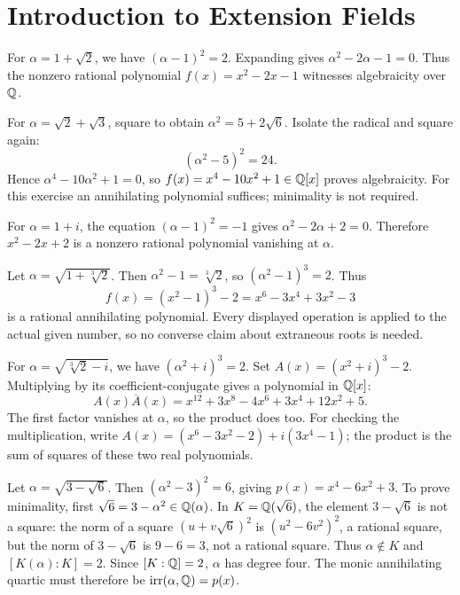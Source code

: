 \section{Introduction to Extension Fields}

For $\alpha=1+\sqrt2$, we have $(\alpha-1)^2=2$. Expanding gives $\alpha^2-2\alpha-1=0$. Thus the nonzero rational polynomial $f(x)=x^2-2x-1$ witnesses algebraicity over $\mathbb{Q}$.

For $\alpha=\sqrt2+\sqrt3$, square to obtain $\alpha^2=5+2\sqrt6$. Isolate the radical and square again:
\[(\alpha^2-5)^2=24.\]
Hence $\alpha^4-10\alpha^2+1=0$, so $f(x)=x^4-10x^2+1\in\mathbb{Q}[x]$ proves algebraicity. For this exercise an annihilating polynomial suffices; minimality is not required.

For $\alpha=1+i$, the equation $(\alpha-1)^2=-1$ gives $\alpha^2-2\alpha+2=0$. Therefore $x^2-2x+2$ is a nonzero rational polynomial vanishing at $\alpha$.

Let $\alpha=\sqrt{1+\sqrt[3]2}$. Then $\alpha^2-1=\sqrt[3]2$, so $(\alpha^2-1)^3=2$. Thus
\[f(x)=(x^2-1)^3-2=x^6-3x^4+3x^2-3\]
is a rational annihilating polynomial. Every displayed operation is applied to the actual given number, so no converse claim about extraneous roots is needed.

For $\alpha=\sqrt{\sqrt[3]2-i}$, we have $(\alpha^2+i)^3=2$. Set $A(x)=(x^2+i)^3-2$. Multiplying by its coefficient-conjugate gives a polynomial in $\mathbb{Q}[x]$:
\[
A(x)\overline{A}(x)=x^{12}+3x^8-4x^6+3x^4+12x^2+5.
\]
The first factor vanishes at $\alpha$, so the product does too. For checking the multiplication, write $A(x)=(x^6-3x^2-2)+i(3x^4-1)$; the product is the sum of squares of these two real polynomials.

Let $\alpha=\sqrt{3-\sqrt6}$. Then $(\alpha^2-3)^2=6$, giving $p(x)=x^4-6x^2+3$.
To prove minimality, first $\sqrt6=3-\alpha^2\in\mathbb{Q}(\alpha)$. In $K=\mathbb{Q}(\sqrt6)$, the element $3-\sqrt6$ is not a square: the norm of a square $(u+v\sqrt6)^2$ is $(u^2-6v^2)^2$, a rational square, but the norm of $3-\sqrt6$ is $9-6=3$, not a rational square. Thus $\alpha\notin K$ and $[K(\alpha):K]=2$. Since $[K:\mathbb{Q}]=2$, $\alpha$ has degree four. The monic annihilating quartic must therefore be $\operatorname{irr}(\alpha,\mathbb{Q})=p(x)$.

